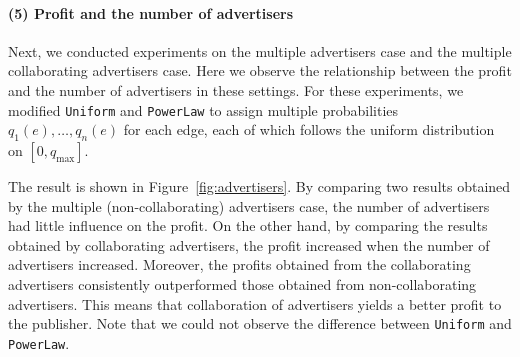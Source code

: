 \documentclass[letterpaper]{article}
\theoremstyle{definition}
\begin{document}
\vspace{-1em}
\paragraph{(5) Profit and the number of advertisers}

Next, we conducted experiments on the multiple advertisers case and the multiple collaborating advertisers case.
Here we observe the relationship between the profit and the number of advertisers in these settings.
For these experiments, we modified \texttt{Uniform} and \texttt{PowerLaw}
to assign multiple probabilities $q_1(e), \ldots, q_n(e)$ for each edge, each of which follows the uniform distribution on $[0, q_{\text{max}}]$.

The result is shown in Figure~\ref{fig:advertisers}.
By comparing two results obtained by the multiple (non-collaborating) advertisers case, the number of advertisers had little influence on the profit.
On the other hand, by comparing the results obtained by collaborating advertisers, the profit increased when the number of advertisers increased.
Moreover, the profits obtained from the collaborating advertisers consistently outperformed those obtained from non-collaborating advertisers.
This means that collaboration of advertisers yields a better profit to the publisher.
Note that we could not observe the difference between \texttt{Uniform} and \texttt{PowerLaw}.
\end{document}
